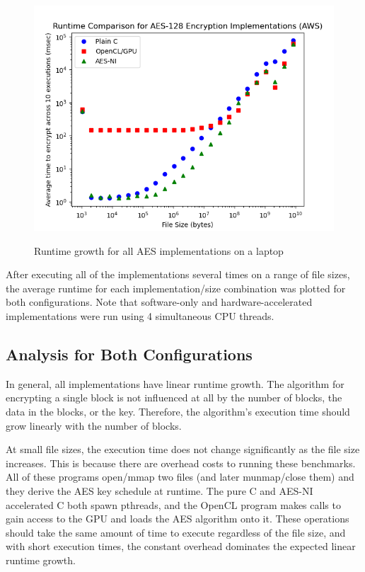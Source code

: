 \documentclass[a4paper,10pt]{article}
\begin{document}
\begin{figure}[H]
 \begin{center}
  \includegraphics[width=\textwidth]{results_aws.png}
  \label{plot_aws}
  \caption{Runtime growth for all AES implementations on a laptop}
 \end{center}
\end{figure}

After executing all of the implementations several times on a range of file sizes, the average runtime for each implementation/size combination was plotted for both configurations.  Note that software-only and hardware-accelerated implementations were run using 4 simultaneous CPU threads.

\subsection{Analysis for Both Configurations}
In general, all implementations have linear runtime growth.  The algorithm for encrypting a single block is not influenced at all by the number of blocks, the data in the blocks, or the key.  Therefore, the algorithm's execution time should grow linearly with the number of blocks.

At small file sizes, the execution time does not change significantly as the file size increases.  This is because there are overhead costs to running these benchmarks.  All of these programs open/mmap two files (and later munmap/close them) and they derive the AES key schedule at runtime.  The pure C and AES-NI accelerated C both spawn pthreads, and the OpenCL program makes calls to gain access to the GPU and loads the AES algorithm onto it.  These operations should take the same amount of time to execute regardless of the file size, and with short execution times, the constant overhead dominates the expected linear runtime growth.
\end{document}
